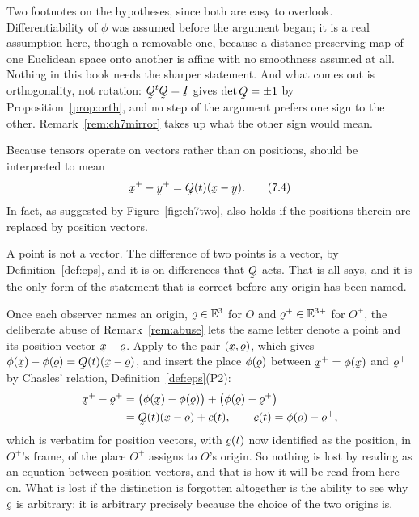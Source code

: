\begin{remark}
Two footnotes on the hypotheses, since both are easy to overlook.
Differentiability of $\phi$ was assumed before the argument began; it is
a real assumption here, though a removable one, because a
distance-preserving map of one Euclidean space onto another is affine
with no smoothness assumed at all. Nothing in this book needs the sharper
statement. And what comes out is orthogonality, not rotation:
$\bQ^{t}\bQ=\I$ gives $\det\bQ=\pm1$ by
Proposition~\ref{prop:orth}, and no step of the argument prefers one sign
to the other. Remark~\ref{rem:ch7mirror} takes up what the other sign
would mean.
\end{remark}

Because tensors operate on vectors rather than on positions, 
should be interpreted to mean
\begin{equation}
   \bx^{+}-\by^{+}=\bQ(t)(\bx-\by).
   \tag{7.4}\label{eq:7.4}
\end{equation}
In fact, as suggested by Figure~\ref{fig:ch7two},  also holds if
the positions therein are replaced by position vectors.

\begin{remark}\label{rem:ch7pointvec}
A point is not a vector. The difference of two points is a vector, by
Definition~\ref{def:eps}, and it is on differences that $\bQ$ acts. That
is all  says, and it is the only form of the statement that is
correct before any origin has been named.

Once each observer names an origin, $\bo\in\Et$ for $O$ and
$\bo^{+}\in\mathbb{E}^{3+}$ for $O^{+}$, the deliberate abuse of
Remark~\ref{rem:abuse} lets the same letter denote a point and its
position vector $\bx-\bo$. Apply  to the pair $(\bx,\bo)$, which
gives $\phi(\bx)-\phi(\bo)=\bQ(t)(\bx-\bo)$, and insert the place
$\phi(\bo)$ between $\bx^{+}=\phi(\bx)$ and $\bo^{+}$ by Chasles'
relation, Definition~\ref{def:eps}(P2):
\[
\begin{aligned}
   \bx^{+}-\bo^{+}&=\big(\phi(\bx)-\phi(\bo)\big)
   +\big(\phi(\bo)-\bo^{+}\big)
   \\
   &=\bQ(t)(\bx-\bo)+\bc(t),\qquad
   \bc(t)=\phi(\bo)-\bo^{+},
\end{aligned}
\]
which is  verbatim for position vectors, with $\bc(t)$ now
identified as the position, in $O^{+}$'s frame, of the place $O^{+}$
assigns to $O$'s origin. So nothing is lost by reading  as an
equation between position vectors, and that is how it will be read from
here on. What is lost if the distinction is forgotten altogether is the
ability to see why $\bc$ is arbitrary: it is arbitrary precisely because
the choice of the two origins is.
\end{remark}

